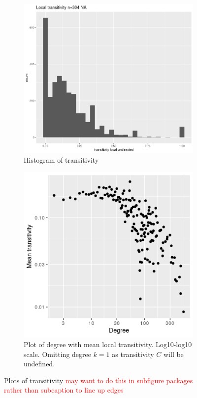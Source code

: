     
\begin{figure}
    \centering
    \begin{subfigure}[t]{0.45\textwidth}
        \centering
        \includegraphics[width=\linewidth]{images/Rplot_transitivity.png} 
        \caption{Histogram of transitivity} \label{fig:transitivity}
    \end{subfigure}
    \hfill
    \begin{subfigure}[t]{0.45\textwidth}
        \centering
        \includegraphics[width=\linewidth]{images/Rplot01_logdegree_log_transitivity.png} 
        \caption{Plot of degree with mean local transitivity. Log10-log10 scale. Omitting degree $k=1$ as transitivity $C$ will be undefined.} \label{fig:log_transitivity_degree}
    \end{subfigure}
    \caption{Plots of transitivity \textcolor{red}{may want to do this in subfigure packages rather than subcaption to line up edges}}
\end{figure}



